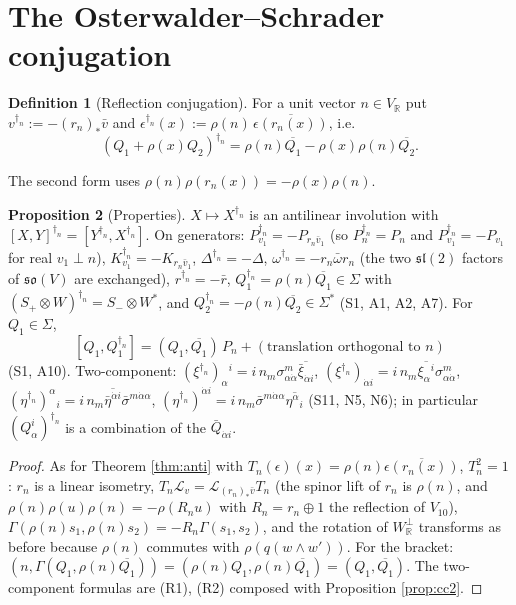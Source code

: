 \documentclass[11pt]{article}
\theoremstyle{definition}
\newtheorem{definition}{Definition}[section]
\newtheorem{proposition}[definition]{Proposition}
\begin{document}
\section{The Osterwalder--Schrader conjugation}

\begin{definition}[Reflection conjugation]
\label{def:dagn}
For a unit vector $n\in V_{\mathbb R}$ put $v^{\dagger_n}:=-(r_n)_*\bar v$ and $\epsilon^{\dagger_n}(x):=\rho(n)\,\overline{\epsilon(r_n(x))}$, i.e.
\[
(Q_1+\rho(x)Q_2)^{\dagger_n}=\rho(n)\overline{Q_1}-\rho(x)\rho(n)\overline{Q_2}.
\]
\end{definition}

The second form uses $\rho(n)\rho(r_n(x))=-\rho(x)\rho(n)$.

\begin{proposition}[Properties]
\label{prop:dagn}
$X\mapsto X^{\dagger_n}$ is an antilinear involution with $[X,Y]^{\dagger_n}=[Y^{\dagger_n},X^{\dagger_n}]$. On generators: $P_{v_1}^{\dagger_n}=-P_{r_n\bar v_1}$ (so $P_n^{\dagger_n}=P_n$ and $P_{v_1}^{\dagger_n}=-P_{v_1}$ for real $v_1\perp n$), $K_{v_1}^{\dagger_n}=-K_{r_n\bar v_1}$, $\Delta^{\dagger_n}=-\Delta$, $\omega^{\dagger_n}=-r_n\bar\omega r_n$ (the two $\mathfrak{sl}(2)$ factors of $\mathfrak{so}(V)$ are exchanged), $r^{\dagger_n}=-\bar r$, $Q_1^{\dagger_n}=\rho(n)\overline{Q_1}\in\Sigma$ with $(S_+\otimes W)^{\dagger_n}=S_-\otimes W^*$, and $Q_2^{\dagger_n}=-\rho(n)\overline{Q_2}\in\Sigma^*$ (S1, A1, A2, A7). For $Q_1\in\Sigma$,
\[
[Q_1,Q_1^{\dagger_n}]=(Q_1,\overline{Q_1})\,P_n+(\text{translation orthogonal to }n)
\]
(S1, A10). Two-component: $(\xi^{\dagger_n})_\alpha{}^i=i\,n_m\sigma^m_{\alpha\dot\alpha}\overline{\bar\xi_{\dot\alpha i}}$, $(\xi^{\dagger_n})_{\dot\alpha i}=i\,n_m\overline{\xi_\alpha{}^i}\sigma^m_{\alpha\dot\alpha}$, $(\eta^{\dagger_n})^\alpha{}_i=i\,n_m\overline{\bar\eta^{\dot\alpha i}}\bar\sigma^{m\dot\alpha\alpha}$, $(\eta^{\dagger_n})^{\dot\alpha i}=i\,n_m\bar\sigma^{m\dot\alpha\alpha}\overline{\eta^\alpha{}_i}$ (S11, N5, N6); in particular $(Q^i_\alpha)^{\dagger_n}$ is a combination of the $\bar Q_{\dot\alpha i}$.
\end{proposition}

\begin{proof}
As for Theorem \ref{thm:anti} with $T_n(\epsilon)(x)=\rho(n)\overline{\epsilon(r_n(x))}$, $T_n^2=1$: $r_n$ is a linear isometry, $T_n\mathcal L_v=\mathcal L_{(r_n)_*\bar v}T_n$ (the spinor lift of $r_n$ is $\rho(n)$, and $\rho(n)\rho(u)\rho(n)=-\rho(R_nu)$ with $R_n=r_n\oplus1$ the reflection of $V_{10}$), $\Gamma(\rho(n)s_1,\rho(n)s_2)=-R_n\Gamma(s_1,s_2)$, and the rotation of $W_{\mathbb R}^\perp$ transforms as before because $\rho(n)$ commutes with $\rho(q(w\wedge w'))$. For the bracket: $(n,\Gamma(Q_1,\rho(n)\overline{Q_1}))=(\rho(n)Q_1,\rho(n)\overline{Q_1})=(Q_1,\overline{Q_1})$. The two-component formulas are (R1), (R2) composed with Proposition \ref{prop:cc2}.
\end{proof}
\end{document}
